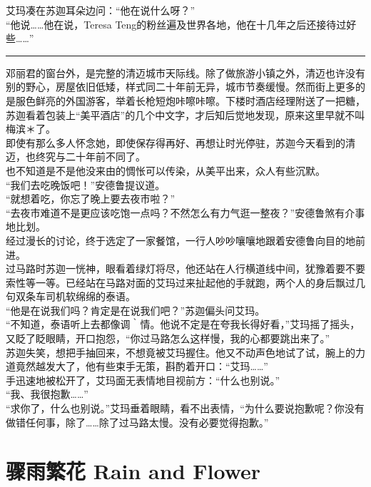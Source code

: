 \documentclass[oneside,11pt]{memoir} %
\begin{document}
\begin{CJK}{UTF8}{gbsn}
    艾玛凑在苏迦耳朵边问：“他在说什么呀？”\\\indent
    “他说……他在说，Teresa Teng的粉丝遍及世界各地，他在十几年之后还接待过好些……”\\\indent
    \rule{-3pt}{30pt}  
    邓丽君的窗台外，是完整的清迈城市天际线。除了做旅游小镇之外，清迈也许没有别的野心，房屋依旧低矮，样式同二十年前无异，城市节奏缓慢。然而街上更多的是服色鲜亮的外国游客，举着长枪短炮咔嚓咔嚓。下楼时酒店经理附送了一把糖，苏迦看着包装上“美平酒店”的几个中文字，才后知后觉地发现，原来这里早就不叫梅滨＊了。\\\indent
    即使有那么多人怀念她，即使保存得再好、再想让时光停驻，苏迦今天看到的清迈，也终究与二十年前不同了。\\\indent
    也不知道是不是他没来由的惆怅可以传染，从美平出来，众人有些沉默。\\\indent
    “我们去吃晚饭吧！”安德鲁提议道。\\\indent
    “就想着吃，你忘了晚上要去夜市啦？”\\\indent
    “去夜市难道不是更应该吃饱一点吗？不然怎么有力气逛一整夜？”安德鲁煞有介事地比划。\\\indent
   经过漫长的讨论，终于选定了一家餐馆，一行人吵吵嚷嚷地跟着安德鲁向目的地前进。\\\indent
   过马路时苏迦一恍神，眼看着绿灯将尽，他还站在人行横道线中间，犹豫着要不要索性等一等。已经站在马路对面的艾玛过来扯起他的手就跑，两个人的身后飘过几句双条车司机软绵绵的泰语。\\\indent
   “他是在说我们吗？肯定是在说我们吧？”苏迦偏头问艾玛。\\\indent
   “不知道，泰语听上去都像调｀情。他说不定是在夸我长得好看，”艾玛摇了摇头，又眨了眨眼睛，开口抱怨，“你过马路怎么这样慢，我的心都要跳出来了。”\\\indent
   苏迦失笑，想把手抽回来，不想竟被艾玛握住。他又不动声色地试了试，腕上的力道竟然越发大了，他有些束手无策，斟酌着开口：“艾玛……”\\\indent
   手迅速地被松开了，艾玛面无表情地目视前方：“什么也别说。”\\\indent
   “我、我很抱歉……”\\\indent
   “求你了，什么也别说。”艾玛垂着眼睛，看不出表情，“为什么要说抱歉呢？你没有做错任何事，除了……除了过马路太慢。没有必要觉得抱歉。”\\\indent
\newpage
\chapter{骤雨繁花    Rain and Flower}
\newpage

\end{CJK}
\end{document}
